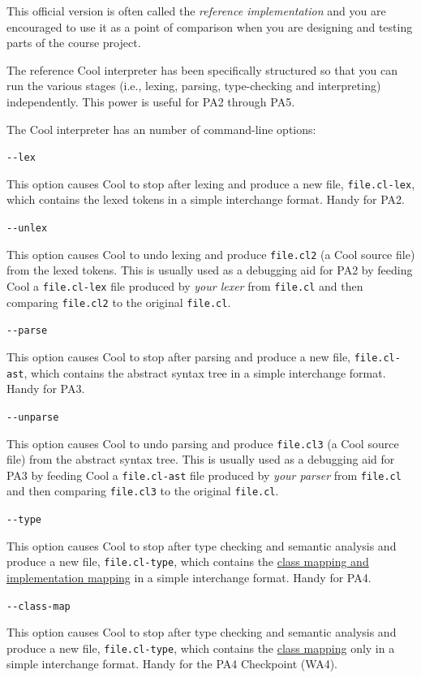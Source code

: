 \documentclass[]{article}
\begin{document}
This official version is often called the \emph{reference
implementation} and you are encouraged to use it as a point of
comparison when you are designing and testing parts of the course
project.

The reference Cool interpreter has been specifically structured so that
you can run the various stages (i.e., lexing, parsing, type-checking and
interpreting) independently. This power is useful for PA2 through PA5.

The Cool interpreter has an number of command-line options:

\texttt{-{}-lex}

This option causes Cool to stop after lexing and produce a new file,
\texttt{file.cl-lex}, which contains the lexed tokens in a simple
interchange format. Handy for PA2.

\texttt{-{}-unlex}

This option causes Cool to undo lexing and produce \texttt{file.cl2} (a
Cool source file) from the lexed tokens. This is usually used as a
debugging aid for PA2 by feeding Cool a \texttt{file.cl-lex} file
produced by \emph{your lexer} from \texttt{file.cl} and then comparing
\texttt{file.cl2} to the original \texttt{file.cl}.

\texttt{-{}-parse}

This option causes Cool to stop after parsing and produce a new file,
\texttt{file.cl-ast}, which contains the abstract syntax tree in a
simple interchange format. Handy for PA3.

\texttt{-{}-unparse}

This option causes Cool to undo parsing and produce \texttt{file.cl3} (a
Cool source file) from the abstract syntax tree. This is usually used as
a debugging aid for PA3 by feeding Cool a \texttt{file.cl-ast} file
produced by \emph{your parser} from \texttt{file.cl} and then comparing
\texttt{file.cl3} to the original \texttt{file.cl}.

\texttt{-{}-type}

This option causes Cool to stop after type checking and semantic
analysis and produce a new file, \texttt{file.cl-type}, which contains
the \href{node47.html}{class mapping and implementation mapping} in a
simple interchange format. Handy for PA4.

\texttt{-{}-class-map}

This option causes Cool to stop after type checking and semantic
analysis and produce a new file, \texttt{file.cl-type}, which contains
the \href{node47.html}{class mapping} only in a simple interchange
format. Handy for the PA4 Checkpoint (WA4).
\end{document}
